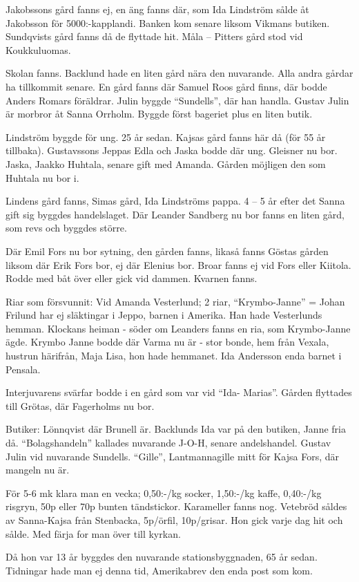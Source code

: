 Jakobssons gård fanns ej, en äng fanns där, som Ida Lindström sålde åt Jakobsson för 5000:-kapplandi. Banken kom senare liksom Vikmans butiken. Sundqvists gård fanns då de flyttade hit. Måla – Pitters gård stod vid Koukkuluomas.

Skolan fanns. Backlund hade en liten gård nära den nuvarande. Alla andra gårdar ha tillkommit senare. En gård fanns där Samuel Roos gård finns, där bodde Anders Romars föräldrar. Julin byggde ``Sundells'', där han handla. Gustav Julin är morbror åt Sanna Orrholm. Byggde först bageriet plus en liten butik.

Lindström byggde för ung. 25 år sedan. Kajsas gård fanns här då (för 55 år tillbaka). Gustavssons Jeppas Edla och Jaska bodde där ung. Gleisner nu bor. Jaska, Jaakko Huhtala, senare gift med Amanda. Gården möjligen den som Huhtala nu bor i.

Lindens gård fanns, Simas gård, Ida Lindströms pappa. 4 – 5 år efter det Sanna gift sig byggdes handelslaget. Där Leander Sandberg nu bor fanns en liten gård, som revs och byggdes större.

Där Emil Fors nu bor sytning, den gården fanns, likaså fanns Göstas gården liksom där Erik Fors bor, ej där Elenius bor.
Broar fanns ej vid Fors eller Kiitola. Rodde med båt över eller gick vid dammen. Kvarnen fanns.

Riar som försvunnit: Vid Amanda Vesterlund; 2 riar,  ``Krymbo-Janne'' = Johan Frilund har ej släktingar i Jeppo, barnen i Amerika. Han hade Vesterlunds hemman. Klockans heiman - söder om Leanders fanns en ria, som Krymbo-Janne ägde. Krymbo Janne bodde där Varma nu är - stor bonde, hem från Vexala, hustrun härifrån, Maja Lisa, hon hade hemmanet. Ida Andersson enda barnet i Pensala.

Interjuvarens svärfar bodde i en gård som var vid ``Ida- Marias''. Gården flyttades till Grötas, där Fagerholms nu bor.

Butiker: Lönnqvist där Brunell är. Backlunds Ida var på den butiken, Janne fria då. ``Bolagshandeln'' kallades nuvarande J-O-H, senare andelshandel. Gustav Julin vid nuvarande Sundells.  ``Gille'', Lantmannagille mitt för Kajsa Fors, där mangeln nu är.

För 5-6 mk klara man en vecka; 0,50:-/kg socker, 1,50:-/kg kaffe, 0,40:-/kg risgryn, 50p eller 70p bunten tändstickor. Karameller fanns nog. Vetebröd såldes av Sanna-Kajsa från Stenbacka, 5p/örfil, 10p/grisar. Hon gick varje dag hit och sålde. Med färja for man över till kyrkan.

Då hon var 13 år byggdes den nuvarande stationsbyggnaden, 65 år sedan. Tidningar hade man ej denna tid, Amerikabrev den enda post som kom.

